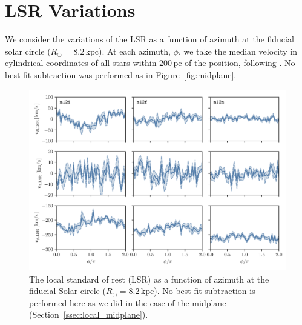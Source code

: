 \documentclass[twocolumn]{aastex62}
\newcommand{\pc}{\text{pc}}
\newcommand{\kpc}{\text{kpc}}
\begin{document}
\section{LSR Variations} \label{app:lsr}
We consider the variations of the LSR as a function of azimuth at the fiducial
solar circle ($R_{\odot} = 8.2\,\kpc$). At each azimuth, $\phi$, we take the
median velocity in cylindrical coordinates of all stars within $200\,\pc$ of
the position, following \citet{2018arXiv180610564S}. No best-fit subtraction
was performed as in Figure~\ref{fig:midplane}.

\begin{figure}
\begin{center}
\includegraphics[width=\textwidth]{fig/lsr.pdf}
\end{center}
\caption{The local standard of rest (LSR) as a function of azimuth at the
fiducial Solar circle ($R_{\odot} = 8.2\,\kpc$). No best-fit subtraction is
performed here as we did in the case of the midplane
(Section~\ref{ssec:local_midplane}).}
\end{figure}


\end{document}
